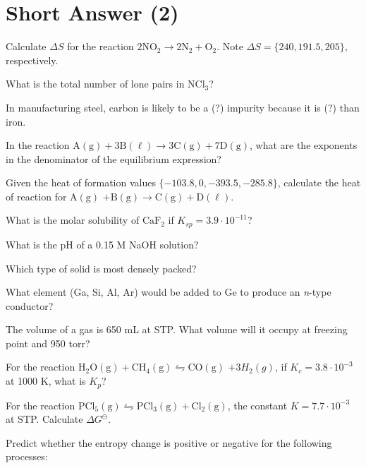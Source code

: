 \documentclass[answers]{exam}
\begin{document}
\newpage
\section{Short Answer (2)}
\begin{multicols}{2}
\begin{questions}

\question Calculate $\Delta S$ for the reaction $\mathrm{2NO_2 \to 2N_2 + O_2}$. Note $\Delta S = \{ 240, 191.5, 205 \}$, respectively.
\answerline[108]

\question What is the total number of lone pairs in $\mathrm{NCl_3}$?
\answerline[10]

\question In manufacturing steel, carbon is likely to be a (?) impurity because it is (?) than iron.

\question In the reaction $\mathrm{A(g) + 3 B(\ell) \to 3 C(g) + 7 D(g)}$, what are the exponents in the denominator of the equilibrium expression?
\answerline[1; 0]

\question Given the heat of formation values $\{-103.8, 0, -393.5, -285.8 \}$, calculate the heat of reaction for $\mathrm{A(g)}$ $\mathrm{ + B(g) \to C(g) + D(\ell)}$.

\question What is the molar solubility of $\mathrm{CaF_2}$ if $K_{sp} = 3.9 \cdot 10^{-11}$?

\question What is the pH of a 0.15 M NaOH solution?
\answerline[13.18]

\question Which type of solid is most densely packed?
\answerline[fcc]

\question What element (Ga, Si, Al, Ar) would be added to Ge to produce an \textit{n}-type conductor?
\answerline[Ar]

\question The volume of a gas is 650 mL at STP. What volume will it occupy at freezing point and 950 torr?
\answerline[520]

\question For the reaction $\mathrm{H_2O(g) + CH_4(g) \leftrightharpoons CO(g)}$ $+ 3H_2(g)$, if $K_c = 3.8 \cdot 10^{-3}$ at 1000 K, what is $K_p$?
\answerline[26]

\question For the reaction $\mathrm{PCl_5(g) \leftrightharpoons PCl_3(g) + Cl_2(g)}$, the constant $K = 7.7 \cdot 10^{-3}$ at STP. Calculate $\Delta G^\ominus$.
\answerline[12,000 J/mol]

\question Predict whether the entropy change is positive or negative for the following processes:
\begin{parts}

\end{parts}
\end{questions}
\end{multicols}
\end{document}
